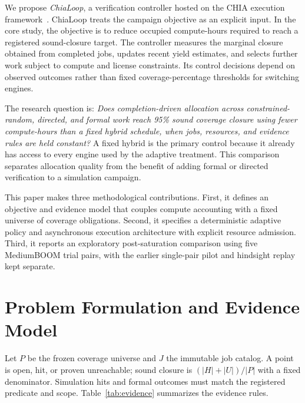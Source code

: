 \documentclass[conference,letterpaper]{IEEEtran}
\begin{document}
We propose \emph{ChiaLoop}, a verification controller hosted on the CHIA execution framework~\cite{chia}. ChiaLoop treats the campaign objective as an explicit input. In the core study, the objective is to reduce occupied compute-hours required to reach a registered sound-closure target. The controller measures the marginal closure obtained from completed jobs, updates recent yield estimates, and selects further work subject to compute and license constraints. Its control decisions depend on observed outcomes rather than fixed coverage-percentage thresholds for switching engines.

The research question is: \emph{Does completion-driven allocation across constrained-random, directed, and formal work reach 95\% sound coverage closure using fewer compute-hours than a fixed hybrid schedule, when jobs, resources, and evidence rules are held constant?} A fixed hybrid is the primary control because it already has access to every engine used by the adaptive treatment. This comparison separates allocation quality from the benefit of adding formal or directed verification to a simulation campaign.

This paper makes three methodological contributions. First, it defines an objective and evidence model that couples compute accounting with a fixed universe of coverage obligations. Second, it specifies a deterministic adaptive policy and asynchronous execution architecture with explicit resource admission. Third, it reports an exploratory post-saturation comparison using five MediumBOOM trial pairs, with the earlier single-pair pilot and hindsight replay kept separate.

\section{Problem Formulation and Evidence Model}
\label{sec:formulation}
Let $P$ be the frozen coverage universe and $J$ the immutable job catalog. A point is open, hit, or proven unreachable; sound closure is $(|H|+|U|)/|P|$ with a fixed denominator. Simulation hits and formal outcomes must match the registered predicate and scope. Table~\ref{tab:evidence} summarizes the evidence rules.
\end{document}
